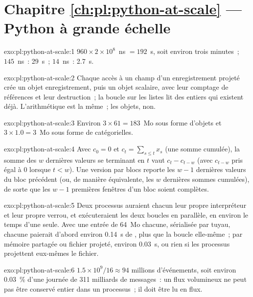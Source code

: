 \section*{Chapitre \ref{ch:pl:python-at-scale} --- Python à grande échelle}

\begin{solution}{exo:pl:python-at-scale:1}
$960 \times 2\times10^8$~ns $= 192$~s, soit environ trois minutes~; $145$~ns~: 29~s~; $14$~ns~: 2.7~s.
\end{solution}

\begin{solution}{exo:pl:python-at-scale:2}
Chaque accès à un champ d'un enregistrement projeté crée un objet enregistrement, puis un objet scalaire, avec leur comptage de références
et leur destruction~; la boucle sur les listes lit des entiers qui existent déjà. L'arithmétique est la même~; les objets, non.
\end{solution}

\begin{solution}{exo:pl:python-at-scale:3}
Environ $3 \times 61 = 183$~Mo sous forme d'objets et $3 \times 1.0 = 3$~Mo sous forme de catégorielles.
\end{solution}

\begin{solution}{exo:pl:python-at-scale:4}
Avec $c_0 = 0$ et $c_t = \sum_{s\le t} x_s$ (une somme cumulée), la somme des $w$ dernières valeurs se terminant en $t$ vaut $c_t - c_{t-w}$ (avec
$c_{t-w}$ pris égal à 0 lorsque $t < w$). Une version par blocs reporte les $w-1$ dernières valeurs du bloc précédent (ou, de manière équivalente, les
$w$ dernières sommes cumulées), de sorte que les $w-1$ premières fenêtres d'un bloc soient complètes.
\end{solution}

\begin{solution}{exo:pl:python-at-scale:5}
Deux processus auraient chacun leur propre interpréteur et leur propre verrou, et exécuteraient les deux boucles en parallèle, en environ le temps d'une seule. Avec une
entrée de 64~Mo chacune, sérialisée par tuyau, chacune paierait d'abord environ 0.14~s de , plus que la boucle elle-même~; par mémoire partagée
ou fichier projeté, environ 0.03~s, ou rien si les processus projettent eux-mêmes le fichier.
\end{solution}

\begin{solution}{exo:pl:python-at-scale:6}
$1.5\times10^9 / 16 \approx 94$ millions d'événements, soit environ 0.03~\% d'une journée de 311 milliards de messages~: un flux volumineux ne peut pas être
conservé entier dans un processus~; il doit être lu en flux.
\end{solution}

